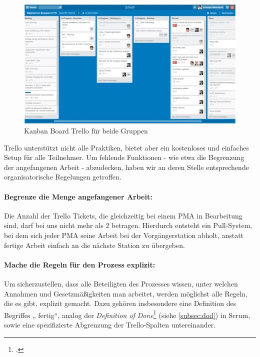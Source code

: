 \begin{figure}[ht]
	\centering
		\includegraphics[scale=0.8]{images/kanbanboard.jpg} 
	\caption[Screenshot des Kanban Board Trello für beide Gruppen]{Kanban Board Trello für beide Gruppen}
	\label{fig:nettop}
\end{figure}

Trello unterstützt nicht alle Praktiken, bietet aber ein kostenloses und einfaches Setup für alle Teilnehmer. Um fehlende Funktionen - wie etwa die Begrenzung der angefangenen Arbeit - abzudecken, haben wir an deren Stelle entsprechende organisatorische Regelungen getroffen.

\paragraph{Begrenze die Menge angefangener Arbeit:}Die Anzahl der Trello Tickets, die gleichzeitig bei einem PMA in Bearbeitung sind, darf bei uns nicht mehr als 2 betragen. Hierdurch entsteht ein Pull-System, bei dem sich jeder PMA seine Arbeit bei der Vorgängerstation abholt, anstatt fertige Arbeit einfach an die nächste Station zu übergeben.

\paragraph{Mache die Regeln für den Prozess explizit:}Um sicherzustellen, dass alle Beteiligten des Prozesses wissen, unter welchen Annahmen und Gesetzmäßigkeiten man arbeitet, werden möglichst alle Regeln, die es gibt, explizit gemacht. Dazu gehören insbesondere eine Definition des Begriffes „
fertig“, analog der \emph{Definition of Done}\footcite{wikiScrum} (siehe \ref{subsec:dod}) in Scrum, sowie eine spezifizierte Abgrenzung der Trello-Spalten untereinander.

